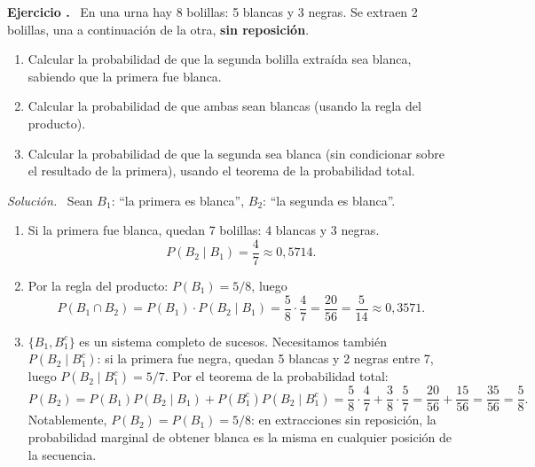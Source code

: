 \documentclass[11pt,a4paper]{article}
\newcounter{ejnum}
\newenvironment{ejercicio}{\refstepcounter{ejnum}\par\medskip\noindent\textbf{Ejercicio \theejnum.}~}{\par}
\newenvironment{solucion}{\par\noindent\textit{Solución.}~}{\par\vspace{1em}}
\begin{document}
\begin{ejercicio}
En una urna hay 8 bolillas: 5 blancas y 3 negras. Se extraen 2 bolillas, una a continuación de la otra, \textbf{sin reposición}.
\begin{enumerate}[label=(\alph*)]
\item Calcular la probabilidad de que la segunda bolilla extraída sea blanca, sabiendo que la primera fue blanca.
\item Calcular la probabilidad de que ambas sean blancas (usando la regla del producto).
\item Calcular la probabilidad de que la segunda sea blanca (sin condicionar sobre el resultado de la primera), usando el teorema de la probabilidad total.
\end{enumerate}
\end{ejercicio}
\begin{solucion}
Sean $B_1$: ``la primera es blanca'', $B_2$: ``la segunda es blanca''.
\begin{enumerate}[label=(\alph*)]
\item Si la primera fue blanca, quedan 7 bolillas: 4 blancas y 3 negras.
\[
P(B_2\mid B_1) = \frac{4}{7} \approx 0{,}5714.
\]
\item Por la regla del producto: $P(B_1) = 5/8$, luego
\[
P(B_1\cap B_2) = P(B_1)\cdot P(B_2\mid B_1) = \frac{5}{8}\cdot\frac{4}{7} = \frac{20}{56}=\frac{5}{14}\approx 0{,}3571.
\]
\item $\{B_1,B_1^c\}$ es un sistema completo de sucesos. Necesitamos también $P(B_2\mid B_1^c)$: si la primera fue negra, quedan 5 blancas y 2 negras entre 7, luego $P(B_2\mid B_1^c)=5/7$. Por el teorema de la probabilidad total:
\[
P(B_2) = P(B_1)P(B_2\mid B_1) + P(B_1^c)P(B_2\mid B_1^c) = \frac{5}{8}\cdot\frac{4}{7} + \frac{3}{8}\cdot\frac{5}{7} = \frac{20}{56}+\frac{15}{56}=\frac{35}{56}=\frac{5}{8}.
\]
Notablemente, $P(B_2)=P(B_1)=5/8$: en extracciones sin reposición, la probabilidad marginal de obtener blanca es la misma en cualquier posición de la secuencia.
\end{enumerate}
\end{solucion}
\end{document}
